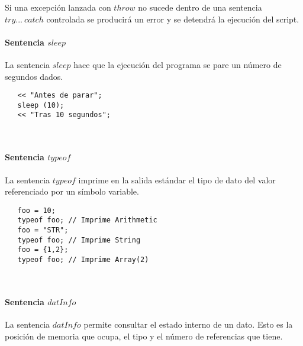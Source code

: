 Si una excepción lanzada con $throw$ no sucede dentro de una sentencia $try...\ catch$ controlada
se producirá un error y se detendrá la ejecución del script.


\paragraph{Sentencia $sleep$} \label{sec:stmt_sleep}

La sentencia $sleep$ hace que la ejecución del programa se pare un número de segundos dados. \\

\begin{lstlisting}
   << "Antes de parar";
   sleep (10);
   << "Tras 10 segundos";
\end{lstlisting}
\hfill\\

\paragraph{Sentencia $typeof$} \label{sec:stmt_typeof}
La sentencia $typeof$ imprime en la salida estándar el tipo de dato del valor 
referenciado por un símbolo variable. \\

\begin{lstlisting}
   foo = 10;
   typeof foo; // Imprime Arithmetic
   foo = "STR";
   typeof foo; // Imprime String
   foo = {1,2};
   typeof foo; // Imprime Array(2)
\end{lstlisting}
\hfill\\

\paragraph{Sentencia $datInfo$} \label{sec:stmt_datInfo}
La sentencia $datInfo$ permite consultar el estado interno de un dato. Esto
es la posición de memoria que ocupa, el tipo y el número de referencias que tiene. \\

